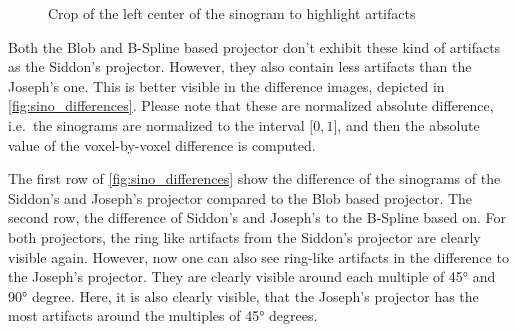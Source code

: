 \begin{figure}[h]
	\centering
	\caption{Crop of the left center of the sinogram to highlight artifacts}%
	\label{fig:sinogram_shepp_logan_center_crop}
\end{figure}

Both the Blob and B-Spline based projector don't exhibit these kind of artifacts as the Siddon's
projector. However, they also contain less artifacts than the Joseph's one. This is better visible
in the difference images, depicted in \autoref{fig:sino_differences}. Please note that these are
normalized absolute difference, i.e.\ the sinograms are normalized to the interval \(\mathopen[0,
	1\mathclose]\), and then the absolute value of the voxel-by-voxel difference is computed.

The first row of \autoref{fig:sino_differences} show the difference of the sinograms of the Siddon's
and Joseph's projector compared to the Blob based projector. The second row, the difference of
Siddon's and Joseph's to the B-Spline based on. For both projectors, the ring like artifacts from
the Siddon's projector are clearly visible again. However, now one can also see ring-like artifacts
in the difference to the Joseph's projector. They are clearly visible around each multiple of 45°
and 90° degree. Here, it is also clearly visible, that the Joseph's projector has the most artifacts
around the multiples of 45° degrees.

